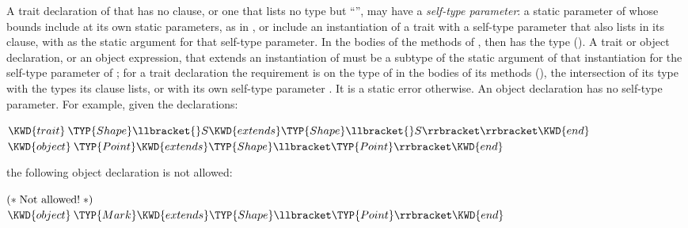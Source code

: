 A trait declaration of  that has no  clause,
or one that lists no type but ``\EXP{\ldots}'', may have a \emph{self-type parameter}:
a static parameter  of 
whose bounds include  at its own static parameters,
as in ,
or include an instantiation of a trait with a self-type parameter
that  also lists in its  clause,
with  as the static argument for that self-type parameter.
In the bodies of the methods of ,
 then has the type  ().
A trait or object declaration, or an object expression,
that extends an instantiation of 
must be a subtype of the static argument of that instantiation
for the self-type parameter of ; for a trait declaration the requirement is on
the type of  in the bodies of its methods (), the intersection of its type
with the types its  clause lists, or with its own self-type parameter .
It is a static error otherwise.
An object declaration has no self-type parameter.
For example, given the declarations:
\begin{Fortress}
\(\KWD{trait}\:\TYP{Shape}\llbracket{}S \KWD{extends} \TYP{Shape}\llbracket{}S\rrbracket\rrbracket \KWD{end}\)\\
\(\KWD{object}\:\TYP{Point} \KWD{extends} \TYP{Shape}\llbracket\TYP{Point}\rrbracket \KWD{end}\)
\end{Fortress}
the following object declaration is not allowed:
\begin{Fortress}
\(\mathtt{(*}\;\hbox{\rm  Not allowed! \unskip}\;\mathtt{*)}\)\\
\(\KWD{object}\:\TYP{Mark} \KWD{extends} \TYP{Shape}\llbracket\TYP{Point}\rrbracket \KWD{end}\)
\end{Fortress}


